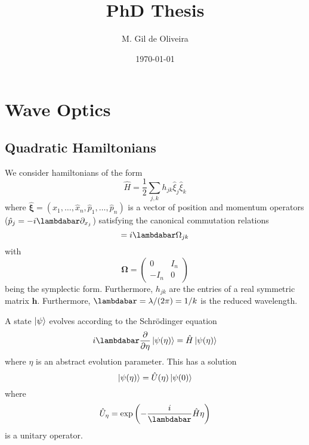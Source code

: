 \documentclass[a4paper,10pt]{report}
\title{PhD Thesis}
\author{M. Gil de Oliveira}
\date{\today}
\begin{document}
\maketitle

\chapter{Wave Optics}

\section{Quadratic Hamiltonians}

We consider hamiltonians of the form
\begin{equation}
\hat{H} = \frac{1}{2} \sum_{j,k} h_{jk} \hat{\xi}_j \hat{\xi}_k
\end{equation}
where $\boldsymbol{\hat{\xi}} = (\hat{x}_1, \ldots, \hat{x}_n, \hat{p}_1, \ldots, \hat{p}_n)$ is a vector of position and momentum operators ($\hat{p}_j = -i \lambdabar \partial_{x_j}$) satisfying the canonical commutation relations
\begin{equation}
[\hat{\xi}_j, \hat{\xi}_k] = i \lambdabar \Omega_{jk}
\end{equation}
with
\begin{equation}
\boldsymbol{\Omega} = \begin{pmatrix}0 & I_n \\ -I_n & 0 \end{pmatrix}
\end{equation}
being the symplectic form. Furthermore, $h_{jk}$ are the entries of a real symmetric matrix $\mathbf{h}$. Furthermore, $\lambdabar = \lambda/(2\pi) = 1/k$ is the reduced wavelength.

A state $\ket{\psi}$ evolves according to the Schrödinger equation
\begin{equation}
    \label{eq:schrodinger_like_equation}
i \lambdabar \frac{\partial}{\partial \eta} \ket{\psi(\eta)} = \hat{H} \ket{\psi(\eta)}
\end{equation}
where $\eta$ is an abstract evolution parameter. This has a solution
\begin{equation}
    \label{eq:schrodinger_like_solution}
    \ket{\psi(\eta)} = \hat{U}(\eta) \ket{\psi(0)}
\end{equation}
where
\begin{equation}\hat{U}_\eta = \exp\left(-\frac{i}{\lambdabar} \hat{H} \eta\right)\end{equation}
is a unitary operator.
\end{document}
